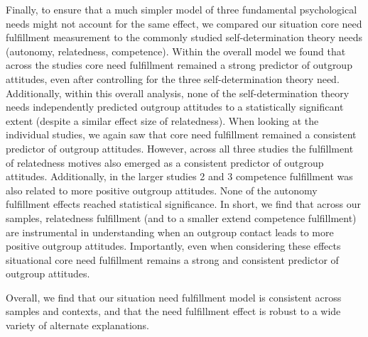 Finally, to ensure that a much simpler model of three fundamental
psychological needs might not account for the same effect, we compared
our situation core need fulfillment measurement to the commonly studied
self-determination theory needs (autonomy, relatedness, competence).
Within the overall model we found that across the studies core need
fulfillment remained a strong predictor of outgroup attitudes, even
after controlling for the three self-determination theory need.
Additionally, within this overall analysis, none of the
self-determination theory needs independently predicted outgroup
attitudes to a statistically significant extent (despite a similar
effect size of relatedness). When looking at the individual studies, we
again saw that core need fulfillment remained a consistent predictor of
outgroup attitudes. However, across all three studies the fulfillment of
relatedness motives also emerged as a consistent predictor of outgroup
attitudes. Additionally, in the larger studies 2 and 3 competence
fulfillment was also related to more positive outgroup attitudes. None
of the autonomy fulfillment effects reached statistical significance. In
short, we find that across our samples, relatedness fulfillment (and to
a smaller extend competence fulfillment) are instrumental in
understanding when an outgroup contact leads to more positive outgroup
attitudes. Importantly, even when considering these effects situational
core need fulfillment remains a strong and consistent predictor of
outgroup attitudes.

Overall, we find that our situation need fulfillment model is consistent
across samples and contexts, and that the need fulfillment effect is
robust to a wide variety of alternate explanations.
